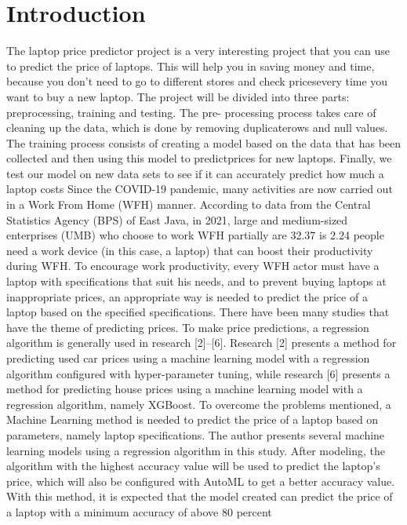 \documentclass[
11pt, %
english, %
singlespacing, %
headsepline, %
]{MastersDoctoralThesis} %
\begin{document}
\section{Introduction}
The laptop price predictor project is a very
interesting project that you can use to predict the 
price of laptops. This will help you in saving money 
and time, because you don’t need to go to different
stores and check pricesevery time you want to buy a
new laptop.
The project will be divided into three parts: preprocessing, training and testing. The pre- processing 
process takes care of cleaning up the data, which is
done by removing duplicaterows and null values.
The training process consists of creating a model 
based on the data that has been collected and then
using this model to predictprices for new laptops. 
Finally, we test our model on new data sets to see if 
it can accurately predict how much a laptop costs\hfill\break
Since the COVID-19 pandemic, many activities 
are now carried out in a Work From Home (WFH) 
manner. According to data from the Central 
Statistics Agency (BPS) of East Java, in 2021, large 
and medium-sized enterprises (UMB) who choose to 
work WFH partially are 32.37%
is 2.24%
people need a work device (in this case, a laptop) 
that can boost their productivity during WFH. To 
encourage work productivity, every WFH actor must 
have a laptop with specifications that suit his needs, 
and to prevent buying laptops at inappropriate 
prices, an appropriate way is needed to predict the 
price of a laptop based on the specified 
specifications.
There have been many studies that have the 
theme of predicting prices. To make price 
predictions, a regression algorithm is generally used 
in research [2]–[6]. Research [2] presents a method 
for predicting used car prices using a machine 
learning model with a regression algorithm 
configured with hyper-parameter tuning, while 
research [6] presents a method for predicting house 
prices using a machine learning model with a 
regression algorithm, namely XGBoost.
To overcome the problems mentioned, a 
Machine Learning method is needed to predict the 
price of a laptop based on parameters, namely laptop 
specifications. The author presents several machine 
learning models using a regression algorithm in this 
study. After modeling, the algorithm with the highest accuracy value will be used to predict the 
laptop's price, which will also be configured with 
AutoML to get a better accuracy value. With this 
method, it is expected that the model created can 
predict the price of a laptop with a minimum 
accuracy of above 80 percent
\end{document}
